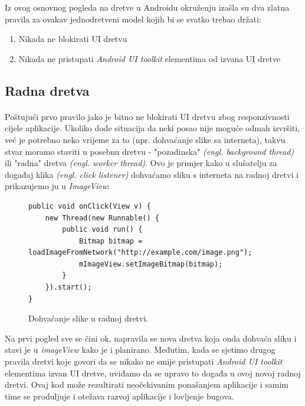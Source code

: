 \documentclass[times, utf8, zavrsni]{fer}
\begin{document}
Iz ovog osnovnog pogleda na dretve u Androidu okruženju izašla su dva zlatna pravila za ovakav jednodretveni model kojih bi se svatko trebao držati:

\begin{enumerate}
\item Nikada ne blokirati UI dretvu
\item Nikada ne pristupati \textit{Android UI toolkit} elementima od izvana UI dretve
\end{enumerate}

\subsection{Radna dretva}
\paragraph{}
Poštujući prvo pravilo jako je bitno ne blokirati UI dretvu zbog responzivnosti cijele aplikacije. Ukoliko dođe situacija da neki posao nije moguće odmah izvršiti, već je potrebno neko vrijeme za to (npr. dohvaćanje slike sa interneta), takvu stvar moramo staviti u posebnu dretvu - "pozadinska" \textit{(engl. background thread)}  ili "radna" dretva \textit{(engl. worker thread)}.\newpage
Ovo je primjer kako u slušatelju za događaj klika \textit{(engl. click listener)} dohvaćamo sliku s interneta na radnoj dretvi i prikazujemo ju u \textit{ImageView}:

\begin{figure}[ht!]
\begin{lstlisting}
public void onClick(View v) {
    new Thread(new Runnable() {
        public void run() {
            Bitmap bitmap = loadImageFromNetwork("http://example.com/image.png");
            mImageView.setImageBitmap(bitmap);
        }
    }).start();
}
\end{lstlisting}
\caption{Dohvaćanje slike u radnoj dretvi.}
\label{overflow}
\end{figure}

Na prvi pogled sve se čini ok, napravila se nova dretva koja onda dohvaća sliku i stavi je u \textit{imageView} kako je i planirano. Međutim, kada se sjetimo drugog pravila dretvi koje govori da se nikako ne smije pristupati \textit{Android UI toolkit} elementima izvan UI dretve, uviđamo da se upravo to događa u ovoj novoj radnoj dretvi. Ovaj kod može rezultirati neočekivanim ponašanjem aplikacije i samim time se produljuje i otežava razvoj aplikacije i lovljenje bugova.\\
\end{document}
